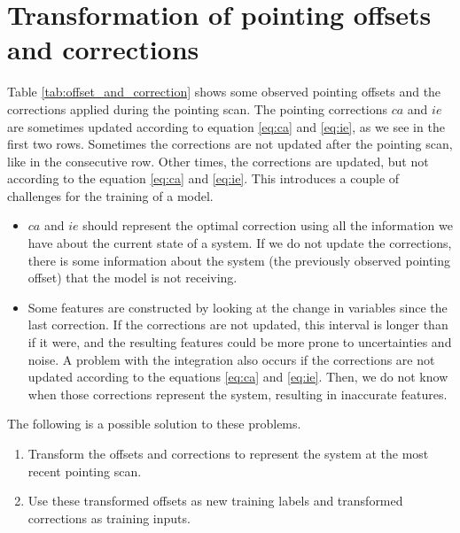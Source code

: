\section{Transformation of pointing offsets and corrections}
Table \ref{tab:offset_and_correction} shows some observed pointing offsets and the corrections applied during the pointing scan.
The pointing corrections $ca$ and $ie$ are sometimes updated according to equation \eqref{eq:ca} and \eqref{eq:ie},
as we see in the first two rows. Sometimes the corrections are not updated after the pointing scan, like in the consecutive row. Other times, the corrections are updated, but not according to the equation \eqref{eq:ca} and \eqref{eq:ie}.
This introduces a couple of challenges for the training of a model.
\begin{itemize}
    \item $ca$ and $ie$ should represent the optimal correction using all the information we have about the current state of a system.
    If we do not update the corrections, there is some information about the system (the previously observed pointing offset) that the model is not receiving.
    \item Some features are constructed by looking at the change in variables since the last correction.
    If the corrections are not updated, this interval is longer than if it were, and the resulting features could be more prone to uncertainties and noise.
    A problem with the integration also occurs if the corrections are not updated according to the equations \eqref{eq:ca} and \eqref{eq:ie}.
    Then, we do not know when those corrections represent the system, resulting in inaccurate features.
\end{itemize}


The following is a possible solution to these problems.
\begin{enumerate}
    \item Transform the offsets and corrections to represent the system at the most recent pointing scan.
    \item Use these transformed offsets as new training labels and transformed corrections as training inputs.
\end{enumerate}

